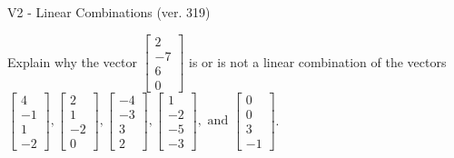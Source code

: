 \begin{exercise}
  \begin{exerciseTitle}V2 - Linear Combinations (ver. 319)\end{exerciseTitle}
  \begin{exerciseStatement}
    Explain why the vector \(\left[\begin{array}{c}
2 \\
-7 \\
6 \\
0
\end{array}\right]\)  is or is not a linear 
	combination of the vectors \(\left[\begin{array}{c}
4 \\
-1 \\
1 \\
-2
\end{array}\right] , \left[\begin{array}{c}
2 \\
1 \\
-2 \\
0
\end{array}\right] , \left[\begin{array}{c}
-4 \\
-3 \\
3 \\
2
\end{array}\right] , \left[\begin{array}{c}
1 \\
-2 \\
-5 \\
-3
\end{array}\right] , \text{ and } \left[\begin{array}{c}
0 \\
0 \\
3 \\
-1
\end{array}\right]\).
	



\end{exerciseStatement}
\end{exercise}
